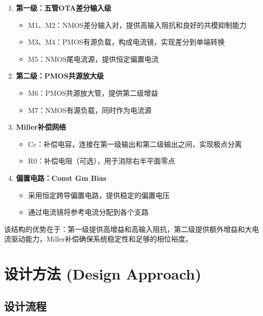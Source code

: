 \documentclass[UTF8,12pt,a4paper]{ctexart}
\begin{document}
\begin{enumerate}
    \item \textbf{第一级：五管OTA差分输入级}
    \begin{itemize}
        \item M1、M2：NMOS差分输入对，提供高输入阻抗和良好的共模抑制能力
        \item M3、M4：PMOS有源负载，构成电流镜，实现差分到单端转换
        \item M5：NMOS尾电流源，提供恒定偏置电流
    \end{itemize}
    
    \item \textbf{第二级：PMOS共源放大级}
    \begin{itemize}
        \item M6：PMOS共源放大管，提供第二级增益
        \item M7：NMOS有源负载，同时作为电流源
    \end{itemize}
    
    \item \textbf{Miller补偿网络}
    \begin{itemize}
        \item Cc：补偿电容，连接在第一级输出和第二级输出之间，实现极点分离
        \item R0：补偿电阻（可选），用于消除右半平面零点
    \end{itemize}
    
    \item \textbf{偏置电路：Const Gm Bias}
    \begin{itemize}
        \item 采用恒定跨导偏置电路，提供稳定的偏置电压
        \item 通过电流镜将参考电流分配到各个支路
    \end{itemize}
\end{enumerate}

该结构的优势在于：第一级提供高增益和高输入阻抗，第二级提供额外增益和大电流驱动能力，Miller补偿确保系统稳定性和足够的相位裕度。

\section{设计方法 (Design Approach)}

\subsection{设计流程}
\end{document}
